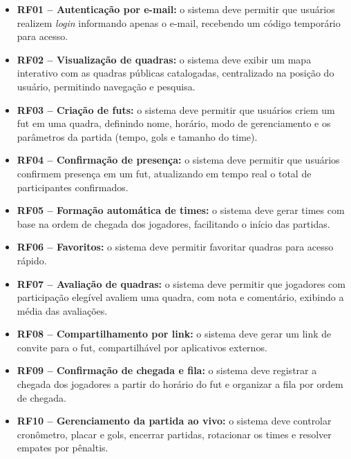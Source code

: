       \begin{itemize}
          \item \textbf{RF01 – Autenticação por e-mail:} o sistema deve permitir que usuários realizem \textit{login} informando apenas o e-mail, recebendo um código temporário para acesso.
          
          \item \textbf{RF02 – Visualização de quadras:} o sistema deve exibir um mapa interativo com as quadras públicas catalogadas, centralizado na posição do usuário, permitindo navegação e pesquisa.

          \item \textbf{RF03 – Criação de futs:} o sistema deve permitir que usuários criem um fut em uma quadra, definindo nome, horário, modo de gerenciamento e os parâmetros da partida (tempo, gols e tamanho do time).

          \item \textbf{RF04 – Confirmação de presença:} o sistema deve permitir que usuários confirmem presença em um fut, atualizando em tempo real o total de participantes confirmados.

          \item \textbf{RF05 – Formação automática de times:} o sistema deve gerar times com base na ordem de chegada dos jogadores, facilitando o início das partidas.

          \item \textbf{RF06 – Favoritos:} o sistema deve permitir favoritar quadras para acesso rápido.

          \item \textbf{RF07 – Avaliação de quadras:} o sistema deve permitir que jogadores com participação elegível avaliem uma quadra, com nota e comentário, exibindo a média das avaliações.

          \item \textbf{RF08 – Compartilhamento por link:} o sistema deve gerar um link de convite para o fut, compartilhável por aplicativos externos.

          \item \textbf{RF09 – Confirmação de chegada e fila:} o sistema deve registrar a chegada dos jogadores a partir do horário do fut e organizar a fila por ordem de chegada.

          \item \textbf{RF10 – Gerenciamento da partida ao vivo:} o sistema deve controlar cronômetro, placar e gols, encerrar partidas, rotacionar os times e resolver empates por pênaltis.


\end{itemize}
